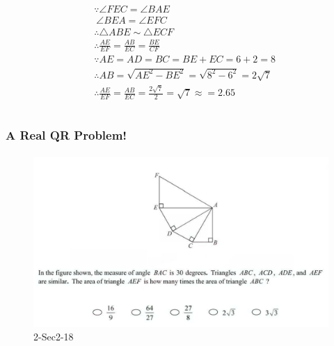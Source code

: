 \documentclass[
	11pt, %
]{beamer}
\begin{document}
\begin{frame}
\begin{columns}[t]
		\begin{column}{0.7\textwidth} %
     \begin{equation*}
				\begin{aligned}
				&\because \angle FEC = \angle BAE \\ 
				& \ \angle BEA = \angle EFC\\
				& \therefore \triangle ABE \sim \triangle ECF\\
				& \therefore \frac{AE}{EF} = \frac{AB}{EC} = \frac{BE}{CF}\\
				& \because AE = AD = BC = BE + EC = 6 + 2 =8 \\
				&\therefore AB = \sqrt{AE^2 - BE^2}=\sqrt{8^2 - 6^2} = 2\sqrt{7} \\
				&\therefore \frac{AE}{EF}=\frac{AB}{EC}=\frac{2\sqrt{7}}{2}=\sqrt{7}\approx=2.65
				\end{aligned}
			\end{equation*}		
		\end{column}
	\end{columns}
\end{frame}



\begin{frame}
	\frametitle{A Real QR Problem!}
	\framesubtitle{}
	\begin{figure}
		\includegraphics[width=\linewidth]{Similar_Triangle_Example_Question2.png}
		\caption{2-Sec2-18}
	\end{figure}
\end{frame}

\end{document}
